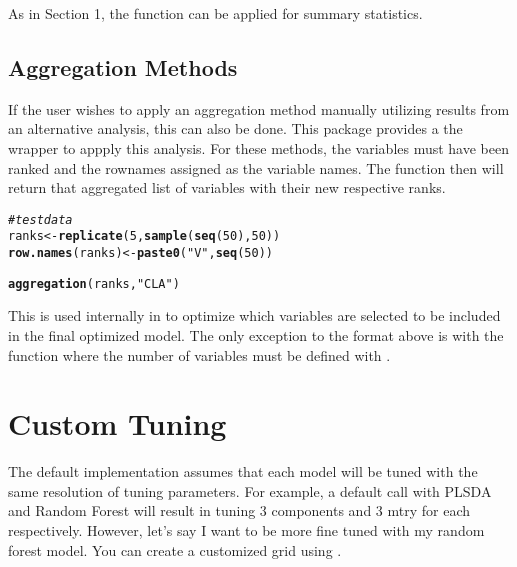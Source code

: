 \documentclass[12pt]{article}\usepackage[]{graphicx}\usepackage[usenames,dvipsnames]{color}
\makeatletter
\newcommand{\hlnum}[1]{\textcolor[rgb]{0.686,0.059,0.569}{#1}}%
\newcommand{\hlstr}[1]{\textcolor[rgb]{0.192,0.494,0.8}{#1}}%
\newcommand{\hlcom}[1]{\textcolor[rgb]{0.678,0.584,0.686}{\textit{#1}}}%
\newcommand{\hlstd}[1]{\textcolor[rgb]{0.345,0.345,0.345}{#1}}%
\newcommand{\hlkwb}[1]{\textcolor[rgb]{0.69,0.353,0.396}{#1}}%
\newcommand{\hlkwd}[1]{\textcolor[rgb]{0.737,0.353,0.396}{\textbf{#1}}}%
\newenvironment{kframe}{%
 \def\at@end@of@kframe{}%
 \ifinner\ifhmode%
  \def\at@end@of@kframe{\end{minipage}}%
  \begin{minipage}{\columnwidth}%
 \fi\fi%
 \def\FrameCommand##1{\hskip\@totalleftmargin \hskip-\fboxsep
 \colorbox{shadecolor}{##1}\hskip-\fboxsep
     \hskip-\linewidth \hskip-\@totalleftmargin \hskip\columnwidth}%
 \MakeFramed {\advance\hsize-\width
   \@totalleftmargin\z@ \linewidth\hsize
   \@setminipage}}%
 {\par\unskip\endMakeFramed%
 \at@end@of@kframe}
\newenvironment{knitrout}{}{} %
\makeatother
\begin{document}
As in Section 1, the  function can be applied
for summary statistics.

\newpage
\subsection{Aggregation Methods}

If the user wishes to apply an aggregation method manually utilizing results
from an alternative analysis, this can also be done.  This package provides
a the wrapper  to appply this analysis.  For these 
methods, the variables must have been ranked and the rownames assigned as the
variable names.  The function then will return that aggregated list of 
variables with their new respective ranks.

\begin{knitrout}
\color{fgcolor}\begin{kframe}
\begin{alltt}
\hlcom{# test data}
\hlstd{ranks} \hlkwb{<-} \hlkwd{replicate}\hlstd{(}\hlnum{5}\hlstd{,} \hlkwd{sample}\hlstd{(}\hlkwd{seq}\hlstd{(}\hlnum{50}\hlstd{),} \hlnum{50}\hlstd{))}
\hlkwd{row.names}\hlstd{(ranks)} \hlkwb{<-} \hlkwd{paste0}\hlstd{(}\hlstr{"V"}\hlstd{,} \hlkwd{seq}\hlstd{(}\hlnum{50}\hlstd{))}

\hlkwd{aggregation}\hlstd{(ranks,} \hlstr{"CLA"}\hlstd{)}
\end{alltt}
\end{kframe}
\end{knitrout}

This is used internally in  to optimize which
variables are selected to be included in the final optimized model.  The only
exception to the format above is with the  function where the 
number of variables must be defined with .

\newpage
\maketitle
\section{Custom Tuning}

The default implementation assumes that each model will be tuned with the same
resolution of tuning parameters.  For example, a default call with PLSDA and 
Random Forest will result in tuning 3 components and 3 mtry for each
respectively.  However, let's say I want to be more fine tuned with my
random forest model.  You can create a customized grid using 
.
\end{document}
